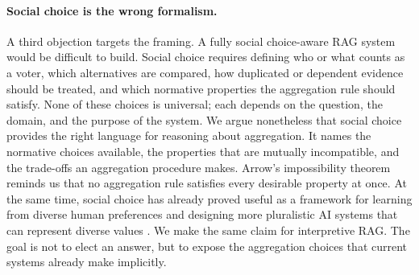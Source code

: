 \paragraph{Social choice is the wrong formalism.} A third objection targets the framing. A fully social choice-aware RAG system would be difficult to build. Social choice requires defining who or what counts as a voter, which alternatives are compared, how duplicated or dependent evidence should be treated, and which normative properties the aggregation rule should satisfy. None of these choices is universal; each depends on the question, the domain, and the purpose of the system. We argue nonetheless that social choice provides the right language for reasoning about aggregation. It names the normative choices available, the properties that are mutually incompatible, and the trade-offs an aggregation procedure makes. Arrow's impossibility theorem \citep{arrow1951socialchoice} reminds us that no aggregation rule satisfies every desirable property at once. At the same time, social choice has already proved useful as a framework for learning from diverse human preferences and designing more pluralistic AI systems that can represent diverse values \citep{noothigattu2018voting,freedman2020akidneyallocation,bakker2022finetuning,brill2023proportionality,ovadya2025position}. We make the same claim for interpretive RAG. The goal is not to elect an answer, but to expose the aggregation choices that current systems already make implicitly.

